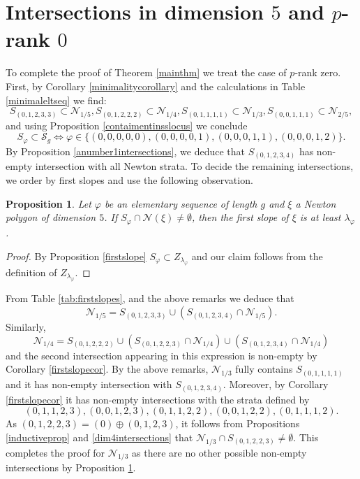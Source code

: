 \documentclass[11pt,table]{amsart}
\numberwithin{equation}{section}
\newtheorem{prop}[thm]{Proposition}
\theoremstyle{definition}
\theoremstyle{remark}
\theoremstyle{remark}
\begin{document}
\section{Intersections in dimension $5$ and $p$-rank $0$} \label{prankzeroproof}
To complete the proof of Theorem \ref{mainthm} we treat the case of $p$-rank zero. First, by Corollary \ref{minimalitycorollary} and the calculations in Table \ref{minimaleltseq} we find:
$$ S_{(0,1,2,3,3)} \subset \mathcal{N}_{1/5}, S_{(0,1,2,2,2)} \subset \mathcal{N}_{1/4}, S_{(0,1,1,1,1)} \subset \mathcal{N}_{1/3}, S_{(0,0,1,1,1)} \subset \mathcal{N}_{2/5},$$
and using Proposition \ref{contaimentinsslocus} we conclude
$$
 S_{\varphi} \subset \mathcal{S}_{g}  \Leftrightarrow \varphi \in \{ (0,0,0,0,0), (0,0,0,0,1), (0,0,0,1,1), (0,0,0,1,2) \}.
$$
By Proposition \ref{anumber1intersections}, we deduce that $S_{(0,1,2,3,4)}$ has non-empty intersection with all Newton strata. To decide the remaining intersections, we order by first slopes and use the following observation. 
\begin{prop} \label{orderingcor}
 Let $\varphi$ be an elementary sequence of length $g$ and $\xi$ a Newton polygon of dimension $5$. If $S_{\varphi} \cap \mathcal{N}(\xi) \ne \emptyset$, then the first slope of $\xi$ is at least $\lambda_{\varphi}$.
\end{prop}
\begin{proof}
 By Proposition \ref{firstslope} $S_{\varphi} \subset Z_{\lambda_{\varphi}}$  and our claim follows from the definition of $Z_{\lambda_{\varphi}}$. 
\end{proof}
From Table \ref{tab:firstslopes}, and the above remarks we deduce that 
$$\mathcal{N}_{1/5} = S_{(0,1,2,3,3)} \cup (S_{(0,1,2,3,4)} \cap  \mathcal{N}_{1/5}).$$
Similarly, 
$$\mathcal{N}_{1/4} = S_{(0,1,2,2,2)} \cup (S_{(0,1,2,2,3)} \cap \mathcal{N}_{1/4}) \cup (S_{(0,1,2,3,4)} \cap \mathcal{N}_{1/4})$$
and the second intersection appearing in this expression is non-empty by Corollary \ref{firstslopecor}.
By the above remarks, $\mathcal{N}_{1/3}$ fully contains $S_{(0,1,1,1,1)}$ and it has non-empty intersection with $S_{(0,1,2,3,4)}$. Moreover, by Corollary \ref{firstslopecor} it has non-empty intersections with the strata defined by
$$(0,1,1,2,3), (0,0,1,2,3), (0,1,1,2,2), (0,0,1,2,2), (0,1,1,1,2).$$
As $(0,1,2,2,3) = (0) \oplus (0,1,2,3)$, it follows from Propositions \ref{inductiveprop} and  \ref{dim4intersections} that $\mathcal{N}_{1/3} \cap S_{(0,1,2,2,3)} \ne \emptyset$. This completes the proof for $\mathcal{N}_{1/3}$ as there are no other possible non-empty intersections by Proposition \ref{orderingcor}.
\end{document}
